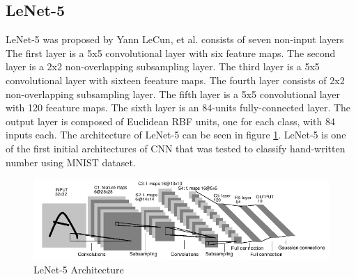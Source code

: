 \subsection{LeNet-5}
LeNet-5 was proposed by Yann LeCun, et al. \cite{lecun1998gradient} consists of seven non-input layers 
The first layer is a 5x5 convolutional layer with six feature maps. The second layer is a 2x2 non-overlapping subsampling layer. The third layer is a 5x5 convolutional layer with sixteen feeature maps. The fourth layer consists of 2x2 non-overlapping subsampling layer. The fifth layer is a 5x5 convolutional layer with 120 feeature maps. The sixth layer is an 84-units fully-connected layer. The output layer is composed of Euclidean RBF units, one for each class, with 84 inputs each. The architecture of LeNet-5 can be seen in figure \ref{fig:lenet5}. LeNet-5 is one of the first initial architectures of CNN that was tested to classify hand-written number using MNIST dataset.


\begin{figure}[h]
	\includegraphics[scale=0.5]{figures/lenet5}
	\centering
	\caption{LeNet-5 Architecture \cite{lecun1998gradient}}
	\label{fig:lenet5}
\end{figure}


